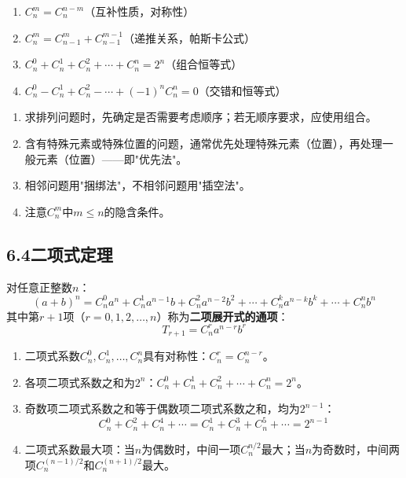 \documentclass[12pt, a4paper]{ctexart}
\begin{document}
\begin{tipbox}[组合数的性质]
\begin{enumerate}[label=\arabic*.]
  \item $C_n^m = C_n^{n-m}$（互补性质，对称性）
  \item $C_n^m = C_{n-1}^{m} + C_{n-1}^{m-1}$（递推关系，帕斯卡公式）
  \item $C_n^0 + C_n^1 + C_n^2 + \cdots + C_n^n = 2^n$（组合恒等式）
  \item $C_n^0 - C_n^1 + C_n^2 - \cdots + (-1)^n C_n^n = 0$（交错和恒等式）
\end{enumerate}
\end{tipbox}

\begin{warnbox}[易错提醒]
\begin{enumerate}[label=\arabic*.]
  \item 求排列问题时，先确定是否需要考虑顺序；若无顺序要求，应使用组合。
  \item 含有特殊元素或特殊位置的问题，通常优先处理特殊元素（位置），再处理一般元素（位置）——即"优先法"。
  \item 相邻问题用"捆绑法"，不相邻问题用"插空法"。
  \item 注意$C_n^m$中$m \leqslant n$的隐含条件。
\end{enumerate}
\end{warnbox}

\subsection*{6.4\quad 二项式定理}

\begin{knowledgebox}[二项式定理]
对任意正整数$n$：
\[
(a+b)^n = C_n^0 a^n + C_n^1 a^{n-1}b + C_n^2 a^{n-2}b^2 + \cdots + C_n^k a^{n-k}b^k + \cdots + C_n^n b^n
\]
其中第$r+1$项（$r = 0, 1, 2, \ldots, n$）称为\textbf{二项展开式的通项}：
\[
T_{r+1} = C_n^r a^{n-r} b^r
\]
\end{knowledgebox}

\begin{knowledgebox}[二项式系数的性质]
\begin{enumerate}[label=\arabic*.]
  \item 二项式系数$C_n^0, C_n^1, \ldots, C_n^n$具有对称性：$C_n^r = C_n^{n-r}$。
  \item 各项二项式系数之和为$2^n$：$C_n^0 + C_n^1 + C_n^2 + \cdots + C_n^n = 2^n$。
  \item 奇数项二项式系数之和等于偶数项二项式系数之和，均为$2^{n-1}$：
  \[
  C_n^0 + C_n^2 + C_n^4 + \cdots = C_n^1 + C_n^3 + C_n^5 + \cdots = 2^{n-1}
  \]
  \item 二项式系数最大项：当$n$为偶数时，中间一项$C_n^{n/2}$最大；当$n$为奇数时，中间两项$C_n^{(n-1)/2}$和$C_n^{(n+1)/2}$最大。
\end{enumerate}
\end{knowledgebox}
\end{document}
